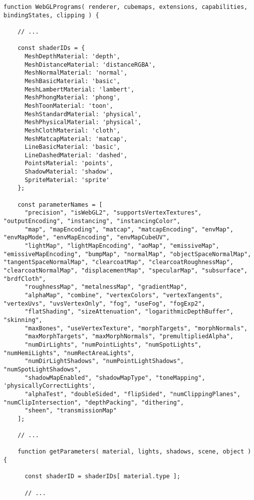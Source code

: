   \begin{lstlisting}[caption=Clase MeshClothMaterial]
  function WebGLPrograms( renderer, cubemaps, extensions, capabilities, bindingStates, clipping ) {
  
    // ...
  
    const shaderIDs = {
      MeshDepthMaterial: 'depth',
      MeshDistanceMaterial: 'distanceRGBA',
      MeshNormalMaterial: 'normal',
      MeshBasicMaterial: 'basic',
      MeshLambertMaterial: 'lambert',
      MeshPhongMaterial: 'phong',
      MeshToonMaterial: 'toon',
      MeshStandardMaterial: 'physical',
      MeshPhysicalMaterial: 'physical',
      MeshClothMaterial: 'cloth',
      MeshMatcapMaterial: 'matcap',
      LineBasicMaterial: 'basic',
      LineDashedMaterial: 'dashed',
      PointsMaterial: 'points',
      ShadowMaterial: 'shadow',
      SpriteMaterial: 'sprite'
    };
  
    const parameterNames = [
      "precision", "isWebGL2", "supportsVertexTextures", "outputEncoding", "instancing", "instancingColor",
      "map", "mapEncoding", "matcap", "matcapEncoding", "envMap", "envMapMode", "envMapEncoding", "envMapCubeUV",
      "lightMap", "lightMapEncoding", "aoMap", "emissiveMap", "emissiveMapEncoding", "bumpMap", "normalMap", "objectSpaceNormalMap", "tangentSpaceNormalMap", "clearcoatMap", "clearcoatRoughnessMap", "clearcoatNormalMap", "displacementMap", "specularMap", "subsurface", "brdfCloth",
      "roughnessMap", "metalnessMap", "gradientMap",
      "alphaMap", "combine", "vertexColors", "vertexTangents", "vertexUvs", "uvsVertexOnly", "fog", "useFog", "fogExp2",
      "flatShading", "sizeAttenuation", "logarithmicDepthBuffer", "skinning",
      "maxBones", "useVertexTexture", "morphTargets", "morphNormals",
      "maxMorphTargets", "maxMorphNormals", "premultipliedAlpha",
      "numDirLights", "numPointLights", "numSpotLights", "numHemiLights", "numRectAreaLights",
      "numDirLightShadows", "numPointLightShadows", "numSpotLightShadows",
      "shadowMapEnabled", "shadowMapType", "toneMapping", 'physicallyCorrectLights',
      "alphaTest", "doubleSided", "flipSided", "numClippingPlanes", "numClipIntersection", "depthPacking", "dithering",
      "sheen", "transmissionMap"
    ];
  
    // ...
  
    function getParameters( material, lights, shadows, scene, object ) {
  
      const shaderID = shaderIDs[ material.type ];
  
      // ...
  

\end{lstlisting}
